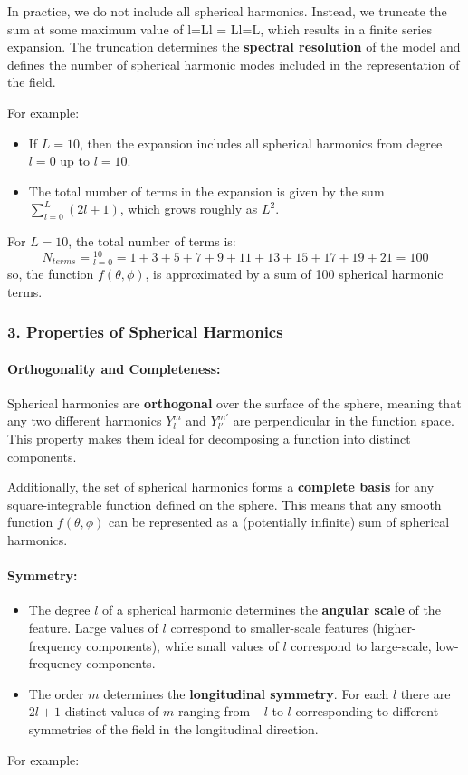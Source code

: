 In practice, we do not include all spherical harmonics. Instead, we truncate the sum at some maximum value of l=Ll = Ll=L, which results in a finite series expansion. The truncation determines the \textbf{spectral resolution} of the model and defines the number of spherical harmonic modes included in the representation of the field.

For example:

\begin{itemize}
    \item If $L=10$, then the expansion includes all spherical harmonics from degree $l=0$ up to $l=10$.
    \item The total number of terms in the expansion is given by the sum $\displaystyle\sum_{l=0}^L(2l+1)$, which grows roughly as $L^2$.
\end{itemize}
For $L=10$, the total number of terms is:
$$N_{terms}=\displaystyle_{l=0}^{10}=1+3+5+7+9+11+13+15+17+19+21=100$$
so, the function $f(\theta,\phi)$, is approximated by a sum of 100 spherical harmonic terms.

\subsubsection{3. \textbf{Properties of Spherical Harmonics}}

\paragraph{\textbf{Orthogonality and Completeness}:}

Spherical harmonics are \textbf{orthogonal} over the surface of the sphere, meaning that any two different harmonics $Y_l^m$ and $Y_{l'}^{m'}$ are perpendicular in the function space. This property makes them ideal for decomposing a function into distinct components.

Additionally, the set of spherical harmonics forms a \textbf{complete basis} for any square-integrable function defined on the sphere. This means that any smooth function $f(\theta,\phi)$ can be represented as a (potentially infinite) sum of spherical harmonics.

\paragraph{\textbf{Symmetry}:}

\begin{itemize}
    \item The degree $l$ of a spherical harmonic determines the \textbf{angular scale} of the feature. Large values of $l$ correspond to smaller-scale features (higher-frequency components), while small values of $l$ correspond to large-scale, low-frequency components.
    \item The order $m$ determines the \textbf{longitudinal symmetry}. For each $l$ there are $2l+1$ distinct values of $m$ ranging from $-l$ to $l$ corresponding to different symmetries of the field in the longitudinal direction.
\end{itemize}
For example:

